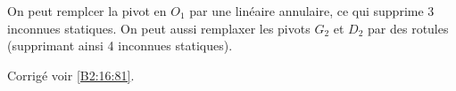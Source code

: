 On peut remplcer la pivot en $O_1$ par une linéaire annulaire, ce qui supprime 3 inconnues statiques. 
On peut aussi remplaxer les pivots $G_2$ et $D_2$ par des rotules (supprimant ainsi 4 inconnues statiques).
\else
\fi
 

\ifprof
\else

\noindent\footnotesize
\normalsize

\begin{flushright}
\footnotesize{Corrigé  voir \ref{B2:16:81}.}
\end{flushright}%
\fi